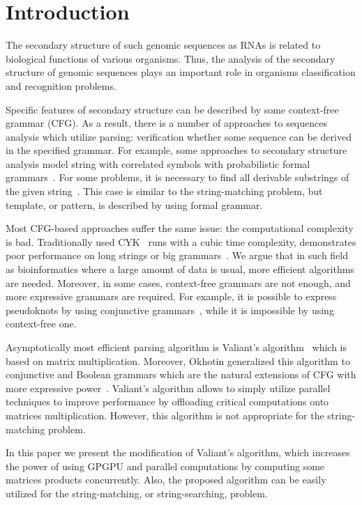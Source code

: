 \section{\bf Introduction}

The secondary structure of such genomic sequences as RNAs is related to biological functions of various organisms.
Thus, the analysis of the secondary structure of genomic sequences plays an important role in organisms classification and recognition problems.

Specific features of secondary structure can be described by some context-free grammar (CFG).
As a result, there is a number of approaches to sequences analysis which utilize parsing: verification whether some sequence can be derived in the specified grammar.
For example, some approaches to secondary structure analysis model string with correlated symbols with probabilistic formal grammars~\cite{knudsen1999rna, dowell2004evaluation}.
For some problems, it is necessary to find all derivable substrings of the given string~\cite{durbin1996biological}.
This case is similar to the string-matching problem, but template, or pattern, is described by using formal grammar.

Most CFG-based approaches suffer the same issue: the computational complexity is bad.
Traditionally used CYK~\cite{kasami1966efficient, Younger:1966:CLP:1441427.1442019} runs with a cubic time complexity, demonstrates poor performance on long strings or big grammars~\cite{liu2005parallel}.
We argue that in such field as bioinformatics where a large amount of data is usual, more efficient algorithms are needed.
Moreover, in some cases, context-free grammars are not enough, and more expressive grammars are required.
For example, it is possible to express pseudoknots by using conjunctive grammars~\cite{zier2013rna}, while it is impossible by using context-free one.

Asymptotically most efficient parsing algorithm is Valiant's algorithm~\cite{Valiant:1975:GCR:1739932.1740048} which is based on matrix multiplication.
Moreover, Okhotin generalized this algorithm to conjunctive and Boolean grammars which are the natural extensions of CFG with more expressive power~\cite{Okhotin:2014:PMM:2565359.2565379}.
Valiant’s algorithm allows to simply utilize parallel techniques to improve performance by offloading critical computations onto matrices multiplication.
However, this algorithm is not appropriate for the string-matching problem.

In this paper we present the modification of Valiant's algorithm, which increases the power of using GPGPU and parallel computations by computing some matrices products concurrently.
Also, the proposed algorithm can be easily utilized for the string-matching, or string-searching, problem.
